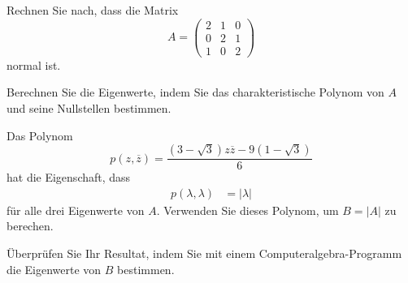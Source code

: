 Rechnen Sie nach, dass die Matrix
\[
A
=
\begin{pmatrix}
2&1&0\\
0&2&1\\
1&0&2
\end{pmatrix}
\]
normal ist.
\begin{teilaufgaben}
\item
Berechnen Sie die Eigenwerte, indem Sie das charakteristische Polynom 
von $A$ und seine Nullstellen bestimmen.
\item
Das Polynom
\[
p(z,\overline{z})
=
\frac{(3-\sqrt{3})z\overline{z}-9(1-\sqrt{3})}{6}
\]
hat die Eigenschaft, dass 
\begin{align*}
p(\lambda,\lambda) &= |\lambda|
\end{align*}
für alle drei Eigenwerte von $A$.
Verwenden Sie dieses Polynom, um $B=|A|$ zu berechen.
\item
Überprüfen Sie Ihr Resultat, indem Sie mit einem Computeralgebra-Programm
die Eigenwerte von $B$ bestimmen.
\end{teilaufgaben}

